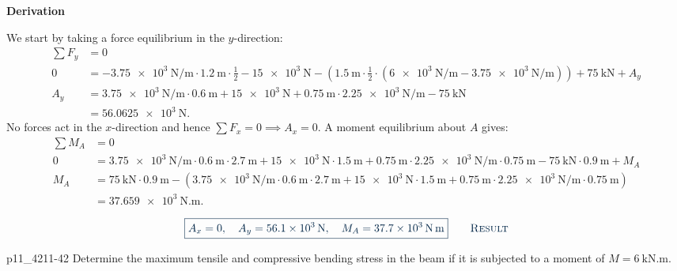 \documentclass[a4paper]{article}
\newcounter{problem}
\numberwithin{equation}{problem}
\newcommand{\AUheading}[1]{%
  \par\vspace{.4\baselineskip}%
  {\sffamily\bfseries\color{AUblueDark}#1\par}%
  \nobreak%
}
\newenvironment{derivation}[1][Derivation]{%
  \AUheading{#1}
  \begingroup\allowdisplaybreaks
  \setlength{\abovedisplayskip}{6pt}%
  \setlength{\belowdisplayskip}{6pt}%
  \setlength{\abovedisplayshortskip}{4pt}%
  \setlength{\belowdisplayshortskip}{4pt}%
}{\par\endgroup\medskip}
\newcommand{\finalresult}[1]{%
  \vspace{.2\baselineskip}%
  \begin{equation}
    {\color{AUblueDark}\boxed{\displaystyle #1}}
    \tag*{\textsc{\textcolor{AUblueDark}{Result}}}
  \end{equation}
  \newpage
}
\begin{document}
\begin{derivation}
  We start by taking a force equilibrium in the $y$-direction:
  \begin{align*}
    \sum F_y &= 0 \\
    0 &= \qty{-3,75e3}{\N\per\m} \cdot \qty{1,2}{\m} \cdot \frac{1}{2} - \qty{15e3}{\N} - \left( \qty{1,5}{\m} \cdot \frac{1}{2} \cdot \left( \qty{6e3}{\N\per\m} - \qty{3,75e3}{\N\per\m} \right) \right) + \qty{75}{\kN} + A_y \\
    A_y &= \qty{3,75e3}{\N\per\m} \cdot \qty{0,6}{\m} + \qty{15e3}{\N} + \qty{0,75}{\m} \cdot \qty{2,25e3}{\N\per\m} - \qty{75}{\kN }  \\
        &= \qty{56,0625e3}{\N} 
  .\end{align*}
  No forces act in the $x$-direction and hence $\sum F_x = 0 \implies A_x = 0$.
  A moment equilibrium about $A$ gives:
  \begin{align*}
    \sum M_A &= 0 \\
    0 &= \qty{3,75e3}{\N\per\m} \cdot \qty{0,6}{\m} \cdot \qty{2,7}{\m} + \qty{15e3}{\N} \cdot \qty{1,5}{\m} + \qty{0,75}{\m} \cdot \qty{2,25e3}{\N\per\m} \cdot \qty{0,75}{\m} - \qty{75}{\kN} \cdot \qty{0,9}{\m} + M_A \\
    M_A &= \qty{75}{\kN} \cdot \qty{0,9}{\m} - \left( \qty{3,75e3}{\N\per\m} \cdot \qty{0,6}{\m} \cdot \qty{2,7}{\m} + \qty{15e3}{\N} \cdot \qty{1,5}{\m} + \qty{0,75}{\m} \cdot \qty{2,25e3}{\N\per\m} \cdot \qty{0,75}{\m} \right) \\
        &= \qty{37,659e3}{\N.\m} 
.\end{align*}
\end{derivation}

\finalresult{A_x = 0, \quad A_y = \qty{56,1e3}{\N}, \quad M_A = \qty{37,7e3}{\N.\m}}


\begin{problemwithimage}{p11_42}{11-42}
  Determine the maximum tensile and compressive bending stress in the beam if it is subjected to a moment of $M = \qty{6}{\kN.\m}$.
\end{problemwithimage}
\end{document}
